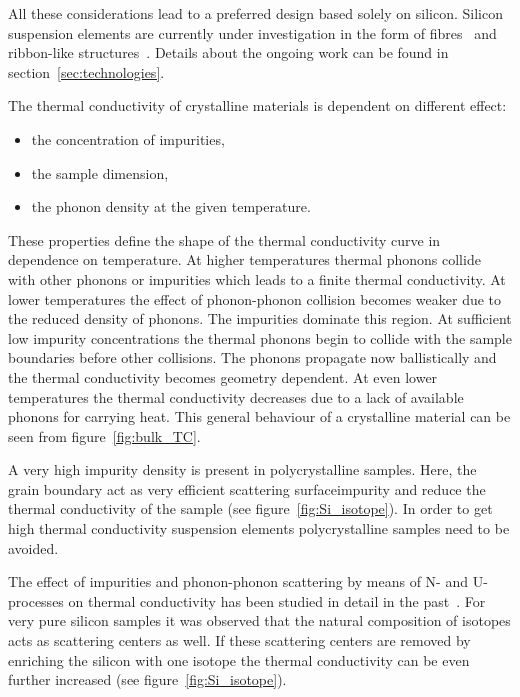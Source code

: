 All these considerations lead to a preferred design based solely on silicon. Silicon suspension elements are currently under investigation in the form of fibres~\cite{articolofibresil} and ribbon-like structures~\cite{Reid2006}. Details about the ongoing work can be found in section~\ref{sec:technologies}.

The thermal conductivity of crystalline materials is dependent on different effect:

\begin{itemize}
\item the concentration of impurities,
\item the sample dimension,
\item the phonon density at the given temperature.
\end{itemize}

These properties define the shape of the thermal conductivity curve in dependence on temperature. At higher temperatures thermal phonons collide with other phonons or impurities which leads to a finite thermal conductivity. At lower temperatures the effect of phonon-phonon collision becomes weaker due to the reduced density of phonons. The impurities dominate this region. At sufficient low impurity concentrations the thermal phonons begin to collide with the sample boundaries before other collisions. The phonons propagate now ballistically and the thermal conductivity becomes geometry dependent. At even lower temperatures the thermal conductivity decreases due to a lack of available phonons for carrying heat. This general behaviour of a crystalline material can be seen from figure~\ref{fig:bulk_TC}. 

A very high impurity density is present in polycrystalline samples. Here, the grain boundary act as very efficient scattering surfaceimpurity and reduce the thermal conductivity of the sample (see figure~\ref{fig:Si_isotope}). In order to get high thermal conductivity suspension elements polycrystalline samples need to be avoided.

The effect of impurities and phonon-phonon scattering by means of N- and U-processes on thermal conductivity has been studied in detail in the past~\cite{Callaway1959, Callaway1960}. For very pure silicon samples it was observed that the natural composition of isotopes acts as scattering centers as well. If these scattering centers are removed by enriching the silicon with one isotope the thermal conductivity can be even further increased (see figure~\ref{fig:Si_isotope}). 

